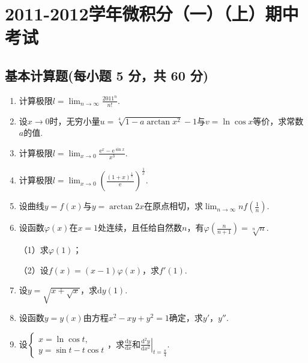 \documentclass[../main.tex]{subfiles}
\begin{document}
\chapter{2011-2012学年微积分（一）（上）期中考试}

\section{基本计算题(每小题 5 分，共 60 分)}
\begin{enumerate}
    \item 计算极限$l=\lim_{n\to\infty}\frac{2011^{n}}{n!}$.
          \vspace{7em}

    \item 设$x\to0$时，无穷小量$u=\sqrt[4]{1-a\arctan x^{2}}-1$与$v=\ln\cos x$等价，求常数$a$的值.
          \vspace{7em}

    \item 计算极限$l=\lim_{x\to 0}\frac{\mathrm{e}^{x}-\mathrm{e}^{\sin x}}{x^{3}}$.
          \vspace{8em}

    \item 计算极限$l=\lim_{x\to 0}\left(\frac{(1+x)^{\frac{1}{x}}}{\mathrm{e}}\right
              )^{\frac{1}{x}}$.
          \vspace{8em}

    \item 设曲线$y=f(x)$与$y=\arctan 2x$在原点相切，求$\lim_{n\to\infty}nf\left(\frac{1}{n}
              \right)$.
          \vspace{9em}

    \item 设函数$\varphi(x)$在$x=1$处连续，且任给自然数$n$，有$\varphi\left(\frac{n}{n+1}
              \right)=\sqrt[n]{n}$.

          （1）求$\varphi(1)$；

          （2）设$f(x)=(x-1)\varphi(x)$，求$f'(1)$.
          \vspace{9em}

    \item 设$y=\sqrt{x+\sqrt{x}}$，求$\mathrm{d}y(1)$.
          \vspace{9em}

    \item 设函数$y=y(x)$由方程$x^{2}-xy+y^{2}=1$确定，求$y'$，$y''$.
          \vspace{9em}

    \item 设$\begin{cases}
                  x=\ln\cos t, \\
                  y=\sin t-t\cos t
              \end{cases}$，求$\frac{\mathrm{d}y}{\mathrm{d}x}$和$\left.\frac{\mathrm{d}^{2}
                  y}{\mathrm{d}x^{2}}\right|_{t=\frac{\pi}{4}}$.
          \vspace{9em}


\end{enumerate}
\end{document}
